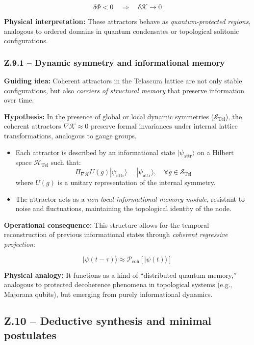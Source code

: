 \documentclass[12pt]{article}
\begin{document}
\[
    \delta \Phi < 0 \quad \Rightarrow \quad \delta \mathcal{K} \rightarrow 0
\]

\textbf{Physical interpretation:}  
These attractors behave as \emph{quantum-protected regions}, analogous to ordered domains in quantum condensates or topological solitonic configurations.

\subsubsection*{Z.9.1 – Dynamic symmetry and informational memory}

\textbf{Guiding idea:} Coherent attractors in the Telascura lattice are not only stable configurations, but also \emph{carriers of structural memory} that preserve information over time.

\textbf{Hypothesis:}  
In the presence of global or local dynamic symmetries ($\mathcal{S}_{\text{Tel}}$), the coherent attractors $\nabla \mathcal{K} \approx 0$ preserve formal invariances under internal lattice transformations, analogous to gauge groups.

\begin{itemize}
    \item Each attractor is described by an informational state $|\psi_{\text{attr}}\rangle$ on a Hilbert space $\mathcal{H}_{\text{Tel}}$ such that:
    \[
        \Pi_{\nabla \mathcal{K}} U(g) |\psi_{\text{attr}}\rangle = |\psi_{\text{attr}}\rangle, \quad \forall g \in \mathcal{S}_{\text{Tel}}
    \]
    where $U(g)$ is a unitary representation of the internal symmetry.

    \item The attractor acts as a \emph{non-local informational memory module}, resistant to noise and fluctuations, maintaining the topological identity of the node.
\end{itemize}
\textbf{Operational consequence:}  
This structure allows for the temporal reconstruction of previous informational states through \emph{coherent regressive projection}:

\[
    |\psi(t - \tau)\rangle \approx \mathcal{P}_\text{coh} \left[ |\psi(t)\rangle \right]
\]

\textbf{Physical analogy:}  
It functions as a kind of “distributed quantum memory,” analogous to protected decoherence phenomena in topological systems (e.g., Majorana qubits), but emerging from purely informational dynamics.

\subsection*{Z.10 – Deductive synthesis and minimal postulates}
\end{document}
